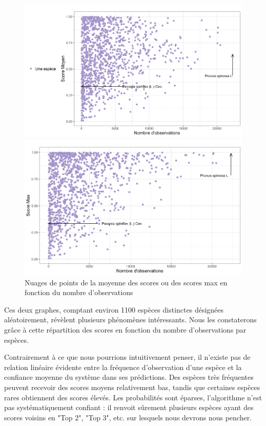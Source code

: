 \documentclass[a4paper,12pt]{article}
\begin{document}
\begin{figure}[H]
\centering
\begin{minipage}{0.5\textwidth}
  \includegraphics[width=0.9\linewidth]{images/mean_rd.png}
\end{minipage}%
\begin{minipage}{0.5\textwidth}
  \includegraphics[width=0.9\linewidth]{images/max_rd.png}
\end{minipage}
\caption{Nuages de points de la moyenne des scores ou des scores max en fonction du nombre d'observations}
\end{figure}

Ces deux graphes, comptant environ 1100 espèces distinctes désignées aléatoirement, révèlent plusieurs phénomènes intéressants. Nous les constaterons grâce à cette répartition des scores en fonction du nombre d'observations par espèces.

\vspace{0.2cm}

Contrairement à ce que nous pourrions intuitivement penser, il n'existe pas de relation linéaire évidente entre la fréquence d'observation d'une espèce et la confiance moyenne du système dans ses prédictions. Des espèces très fréquentes peuvent recevoir des scores moyens relativement bas, tandis que certaines espèces rares obtiennent des scores élevés. Les probabilités sont éparses, l'algorithme n'est pas systématiquement confiant : il renvoit sûrement plusieurs espèces ayant des scores voisins en "Top 2", "Top 3", etc. sur lesquels nous devrons nous pencher.
\end{document}
